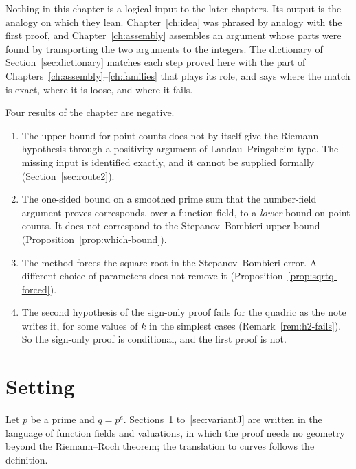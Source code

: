 \documentclass[11pt]{amsbook}
\theoremstyle{plain}
\theoremstyle{definition}
\theoremstyle{remark}
\numberwithin{equation}{section}
\numberwithin{figure}{chapter}
\numberwithin{table}{chapter}
\begin{document}
Nothing in this chapter is a logical input to the later chapters.
Its output is the analogy on which they lean. Chapter~\ref{ch:idea}
was phrased by analogy with the first proof, and
Chapter~\ref{ch:assembly} assembles an argument whose parts were
found by transporting the two arguments to the integers. The dictionary
of Section~\ref{sec:dictionary} matches each step proved here with
the part of Chapters~\ref{ch:assembly}--\ref{ch:families} that
plays its role, and says where the match is exact, where it is
loose, and where it fails.

Four results of the chapter are negative.
\begin{enumerate}
\item The upper bound for point counts does not by itself give the
Riemann hypothesis through a positivity argument of
Landau--Pringsheim type. The missing input is identified exactly,
and it cannot be supplied formally (Section~\ref{sec:route2}).
\item The one-sided bound on a smoothed prime sum that the
number-field argument proves corresponds, over a function field, to
a \emph{lower} bound on point counts. It does not correspond to the
Stepanov--Bombieri upper bound (Proposition~\ref{prop:which-bound}).
\item The method forces the square root in the Stepanov--Bombieri
error. A different choice of parameters does not remove it
(Proposition~\ref{prop:sqrtq-forced}).
\item The second hypothesis of the sign-only proof fails for the
quadric as the note writes it, for some values of $k$ in the
simplest cases (Remark~\ref{rem:h2-fails}). So the sign-only proof
is conditional, and the first proof is not.
\end{enumerate}

\section{Setting}
\label{sec:setting}

Let $p$ be a prime and $q=p^e$. Sections~\ref{sec:setting}
to~\ref{sec:variantJ} are written in the language of function fields
and valuations, in which the proof needs no geometry beyond the
Riemann--Roch theorem; the translation to curves follows the
definition.
\end{document}
